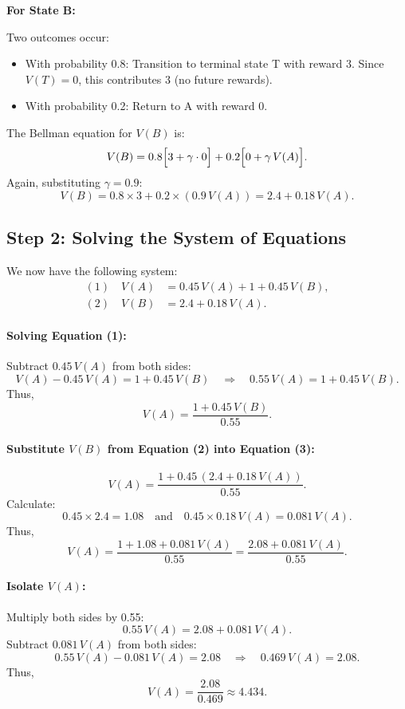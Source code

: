 \documentclass[11pt]{article}
\begin{document}
\textbf{For State B:}

Two outcomes occur:
\begin{itemize}
    \item With probability 0.8: Transition to terminal state T with reward 3. Since \( V(T)=0 \), this contributes \( 3 \) (no future rewards).
    \item With probability 0.2: Return to A with reward 0.
\end{itemize}
The Bellman equation for \( V(B) \) is:
\[
V(B) = 0.8\Bigl[ 3 + \gamma\cdot 0 \Bigr] + 0.2\Bigl[ 0 + \gamma\, V(A) \Bigr].
\]
Again, substituting \( \gamma = 0.9 \):
\[
V(B) = 0.8 \times 3 + 0.2 \times (0.9\, V(A)) = 2.4 + 0.18\, V(A).
\]

\subsection*{Step 2: Solving the System of Equations}

We now have the following system:
\[
\begin{aligned}
(1) \quad V(A) &= 0.45\, V(A) + 1 + 0.45\, V(B), \\[1mm]
(2) \quad V(B) &= 2.4 + 0.18\, V(A).
\end{aligned}
\]

\paragraph{Solving Equation (1):}  
Subtract \( 0.45\, V(A) \) from both sides:
\[
V(A) - 0.45\, V(A) = 1 + 0.45\, V(B) \quad \Longrightarrow \quad 0.55\, V(A) = 1 + 0.45\, V(B).
\]
Thus,
\[
V(A) = \frac{1 + 0.45\, V(B)}{0.55}. \tag{3}
\]

\paragraph{Substitute \( V(B) \) from Equation (2) into Equation (3):}
\[
V(A) = \frac{1 + 0.45 \, (2.4 + 0.18\, V(A))}{0.55}.
\]
Calculate:
\[
0.45 \times 2.4 = 1.08 \quad \text{and} \quad 0.45 \times 0.18\, V(A) = 0.081\, V(A).
\]
Thus,
\[
V(A) = \frac{1 + 1.08 + 0.081\, V(A)}{0.55} = \frac{2.08 + 0.081\, V(A)}{0.55}.
\]

\paragraph{Isolate \( V(A) \):}  
Multiply both sides by 0.55:
\[
0.55\, V(A) = 2.08 + 0.081\, V(A).
\]
Subtract \( 0.081\, V(A) \) from both sides:
\[
0.55\, V(A) - 0.081\, V(A) = 2.08 \quad \Longrightarrow \quad 0.469\, V(A) = 2.08.
\]
Thus,
\[
V(A) = \frac{2.08}{0.469} \approx 4.434.
\]
\end{document}
